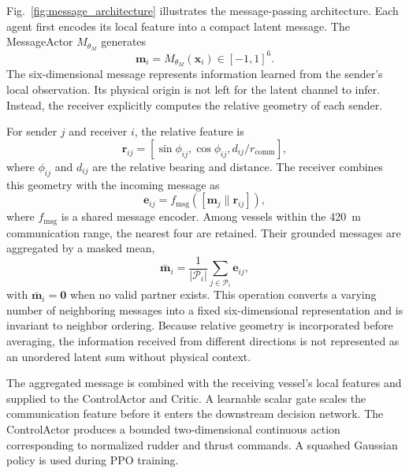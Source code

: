 \documentclass[final,5p,times,twocolumn]{elsarticle}
\begin{document}
{\color{violet}
Fig.~\ref{fig:message_architecture} illustrates the message-passing architecture. Each agent first encodes its local feature into a compact latent message. The MessageActor $M_{\theta_M}$ generates
\begin{equation}
\mathbf{m}_i=M_{\theta_M}(\mathbf{x}_i)\in[-1,1]^6.
\label{eq:message}
\end{equation}
The six-dimensional message represents information learned from the sender's local observation. Its physical origin is not left for the latent channel to infer. Instead, the receiver explicitly computes the relative geometry of each sender.

For sender $j$ and receiver $i$, the relative feature is
\begin{equation}
\mathbf{r}_{ij}=\left[\sin\phi_{ij},\cos\phi_{ij},d_{ij}/r_{\mathrm{comm}}\right],
\label{eq:relative_geometry}
\end{equation}
where $\phi_{ij}$ and $d_{ij}$ are the relative bearing and distance. The receiver combines this geometry with the incoming message as
\begin{equation}
\mathbf{e}_{ij}=f_{\mathrm{msg}}([\mathbf{m}_j\|\mathbf{r}_{ij}]),
\label{eq:grounded_message}
\end{equation}
where $f_{\mathrm{msg}}$ is a shared message encoder. Among vessels within the 420~m communication range, the nearest four are retained. Their grounded messages are aggregated by a masked mean,
\begin{equation}
\bar{\mathbf{m}}_i=
\frac{1}{|\mathcal{P}_i|}\sum_{j\in\mathcal{P}_i}\mathbf{e}_{ij},
\label{eq:message_aggregation}
\end{equation}
with $\bar{\mathbf{m}}_i=\mathbf{0}$ when no valid partner exists. This operation converts a varying number of neighboring messages into a fixed six-dimensional representation and is invariant to neighbor ordering. Because relative geometry is incorporated before averaging, the information received from different directions is not represented as an unordered latent sum without physical context.

The aggregated message is combined with the receiving vessel's local features and supplied to the ControlActor and Critic. A learnable scalar gate scales the communication feature before it enters the downstream decision network. The ControlActor produces a bounded two-dimensional continuous action corresponding to normalized rudder and thrust commands. A squashed Gaussian policy is used during PPO training.
}
\end{document}
